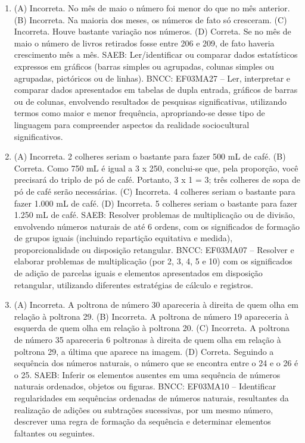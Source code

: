 \begin{enumerate}
\item
(A) Incorreta. No mês de maio o número foi menor do que no mês anterior.
(B) Incorreta. Na maioria dos meses, os números de fato só cresceram.
(C) Incorreta. Houve bastante variação nos números.
(D) Correta. Se no mês de maio o número de livros retirados fosse entre 206 e 209, de fato haveria crescimento mês a mês.
SAEB: Ler/identificar ou comparar dados estatísticos
expressos em gráficos (barras simples ou agrupadas, colunas simples ou
agrupadas, pictóricos ou de linhas).
BNCC: EF03MA27 -- Ler, interpretar e comparar dados apresentados em tabelas de dupla entrada,
gráficos de barras ou de colunas, envolvendo resultados de pesquisas significativas, utilizando
termos como maior e menor frequência, apropriando-se desse tipo de linguagem para compreender aspectos da realidade sociocultural significativos.


\item
(A) Incorreta. 2 colheres seriam o bastante para fazer 500 mL de café.
(B) Correta. Como 750 mL é igual a 3 x 250, conclui-se que, pela proporção, você
precisará do triplo de pó de café. Portanto, 3 x 1 = 3; três colheres de sopa de pó de café serão necessárias.
(C) Incorreta. 4 colheres seriam o bastante para fazer 1.000 mL de café.
(D) Incorreta. 5 colheres seriam o bastante para fazer 1.250 mL de café.
SAEB: Resolver problemas de multiplicação ou de divisão, envolvendo números naturais de até 6 ordens, com os significados de formação de grupos iguais (incluindo repartição equitativa e medida), proporcionalidade ou disposição retangular.
BNCC: EF03MA07 – Resolver e elaborar problemas de multiplicação (por 2, 3, 4, 5 e 10) com os
significados de adição de parcelas iguais e elementos apresentados em disposição retangular,
utilizando diferentes estratégias de cálculo e registros.


\item
(A) Incorreta. A poltrona de número 30 apareceria à direita de quem olha em relação à poltrona 29.
(B) Incorreta. A poltrona de número 19 apareceria à esquerda de quem olha em relação à poltrona 20.
(C) Incorreta. A poltrona de número 35 apareceria  6 poltronas à direita de quem olha em relação à poltrona 29, a última que aparece na imagem.
(D) Correta. Seguindo a sequência dos números naturais, o número que se encontra entre o 24 e o 26 é o 25.
SAEB: Inferir os elementos ausentes em uma sequência de
números naturais ordenados, objetos ou figuras.
BNCC: EF03MA10 -- Identificar regularidades em sequências ordenadas de números naturais,
resultantes da realização de adições ou subtrações sucessivas, por um mesmo número,
descrever uma regra de formação da sequência e determinar elementos faltantes ou seguintes.


\end{enumerate}
